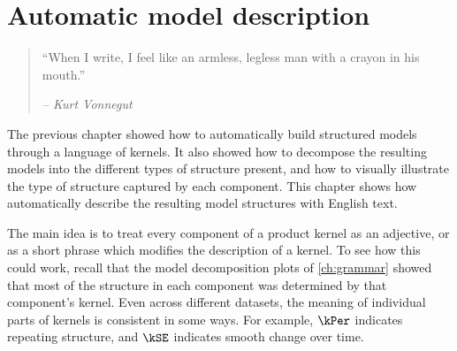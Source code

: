 
\inbpdocument


\chapter{Automatic model description}
\label{ch:description}










\begin{quotation}
``When I write, I feel like an armless, legless man with a crayon in his mouth.''

\hspace*{\fill} \emph{ -- Kurt Vonnegut}
\end{quotation}




The previous chapter showed how to automatically build structured models through a language of kernels.
It also showed how to decompose the resulting models into the different types of structure present, and how to visually illustrate the type of structure captured by each component.
This chapter shows how automatically describe the resulting model structures with English text.

The main idea is to treat every component of a product kernel as an adjective, or as a short phrase which modifies the description of a kernel.
To see how this could work, recall that the model decomposition plots of \cref{ch:grammar} showed that most of the structure in each component was determined by that component's kernel.
Even across different datasets, the meaning of individual parts of kernels is consistent in some ways.
For example, $\kPer$ indicates repeating structure, and $\kSE$ indicates smooth change over time.


